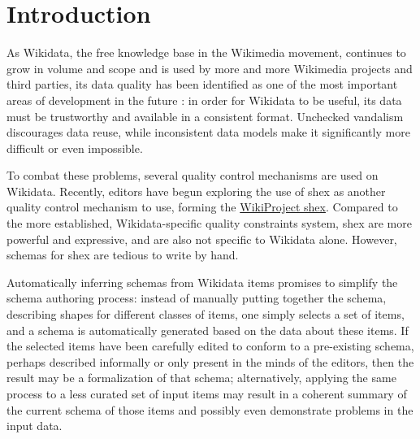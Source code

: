 
\chapter{Introduction}
\label{ch:Introduction}

As \gls{Wikidata},
the free knowledge base in the \gls{Wikimedia} movement,
continues to grow in volume and scope \cite{wikidata-fifth-birthday}
and is used by more and more \gls{Wikimedia} projects and third parties,
its data quality has been identified as one of the most important areas of development in the future \cite{wdcon2017-sotp}:
in order for \gls{Wikidata} to be useful,
its data must be trustworthy and available in a consistent format.
Unchecked vandalism discourages data reuse,
while inconsistent data models make it significantly more difficult or even impossible.

To combat these problems,
several quality control mechanisms are used on \gls{Wikidata}.
Recently, editors have begun exploring the use of \acrlong{shex}
as another quality control mechanism to use,
forming the \href{https://www.wikidata.org/wiki/Wikidata:WikiProject_ShEx}{WikiProject \acrshort{shex}}.
Compared to the more established, \gls{Wikidata}-specific quality constraints system,
\acrlong{shex} are more powerful and expressive,
and are also not specific to \gls{Wikidata} alone.
However, \glspl{schema} for \acrlong{shex} are tedious to write by hand.

Automatically inferring \glspl{schema} from \gls{Wikidata} \glspl{item}
promises to simplify the \gls{schema} authoring process:
instead of manually putting together the \gls{schema},
describing shapes for different classes of \glspl{item},
one simply selects a set of \glspl{item},
and a \gls{schema} is automatically generated based on the data about these \glspl{item}.
If the selected \glspl{item} have been carefully edited
to conform to a pre-existing \gls{schema},
perhaps described informally or only present in the minds of the editors,
then the result may be a formalization of that \gls{schema};
alternatively, applying the same process to a less curated set of input \glspl{item}
may result in a coherent summary of the current \gls{schema} of those \glspl{item}
and possibly even demonstrate problems in the input data.

